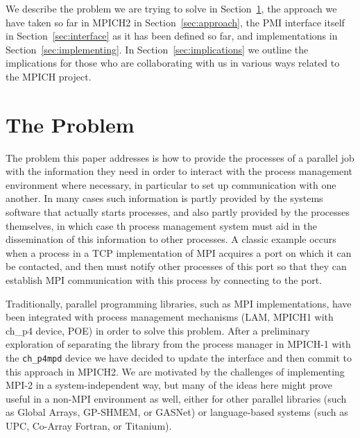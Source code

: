 \documentclass[11pt]{article}
\begin{document}
We describe the problem we are trying to solve in
Section~\ref{sec:problem}, the approach we have taken so far in MPICH2
in Section~\ref{sec:approach}, the PMI interface itself in
Section~\ref{sec:interface} as it has been defined so far, and
implementations in Section~\ref{sec:implementing}.  In
Section~\ref{sec:implications} we outline the implications for those who
are collaborating with us in various ways related to the MPICH project. 

\section{The Problem}
\label{sec:problem}

The problem this paper addresses is how to provide the processes of a
parallel job with the information they need in order to interact with
the process management environment where necessary, in particular to set
up communication with one another.  In many cases such information is
partly provided by the systems software that actually starts processes,
and also partly provided by the processes themselves, in which case th
process management system must aid in the dissemination of this
information to other processes.  A classic example occurs when a process
in a TCP implementation of MPI acquires a port on which it can be
contacted, and then must notify other processes of this port so that
they can establish MPI communication with this process by connecting to
the port.

Traditionally, parallel programming libraries, such as MPI
implementations, have been integrated with process management mechanisms
(LAM, MPICH1 with ch\_p4 device, POE) in order to solve this problem.
After a preliminary exploration of separating the library from the
process manager in MPICH-1 with the {\tt ch\_p4mpd} device we have decided to
update the interface and then commit to this approach in MPICH2.  We are
motivated by the challenges of implementing MPI-2 in a
system-independent way, but many of the ideas here might prove useful in
a non-MPI environment as well, either for other parallel libraries (such
as Global Arrays, GP-SHMEM, or GASNet) or language-based systems (such
as UPC, Co-Array Fortran, or Titanium).
\end{document}
